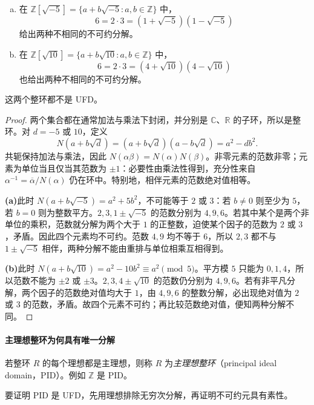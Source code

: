 \documentclass[lang=cn,a4paper,fontset=none,zihao=false,10pt,openany,twoside]{beautybook}
\numberwithin{algorithm}{chapter}
\begin{document}
\begin{example}[唯一分解失效的两个整环]
\begin{enumerate}[(a)]
\item 在 $\mathbb Z[\sqrt{-5}]=\{a+b\sqrt{-5}:a,b\in\mathbb Z\}$ 中，
\[
 6=2\cdot3=(1+\sqrt{-5})(1-\sqrt{-5})
\]
给出两种不相同的不可约分解。
\item 在 $\mathbb Z[\sqrt{10}]=\{a+b\sqrt{10}:a,b\in\mathbb Z\}$ 中，
\[
 6=2\cdot3=(4+\sqrt{10})(4-\sqrt{10})
\]
也给出两种不相同的不可约分解。
\end{enumerate}
这两个整环都不是 UFD。
\end{example}
\begin{proof}
两个集合都在通常加法与乘法下封闭，并分别是 $\mathbb C$、$\mathbb R$ 的子环，所以是整环。对 $d=-5$ 或 $10$，定义
\[
 N(a+b\sqrt d)=(a+b\sqrt d)(a-b\sqrt d)=a^2-db^2.
\]
共轭保持加法与乘法，因此 $N(\alpha\beta)=N(\alpha)N(\beta)$。非零元素的范数非零；元素为单位当且仅当其范数为 $\pm1$：必要性由乘法性得到，充分性来自 $\alpha^{-1}=\overline\alpha/N(\alpha)$ 仍在环中。特别地，相伴元素的范数绝对值相等。

\par\smallskip\noindent\textbf{(a)}\quad 此时 $N(a+b\sqrt{-5})=a^2+5b^2$，不可能等于 $2$ 或 $3$：若 $b\ne0$ 则至少为 $5$，若 $b=0$ 则为整数平方。$2,3,1\pm\sqrt{-5}$ 的范数分别为 $4,9,6$。若其中某个是两个非单位的乘积，范数就分解为两个大于 $1$ 的正整数，迫使某个因子的范数为 $2$ 或 $3$，矛盾。因此四个元素均不可约。范数 $4,9$ 均不等于 $6$，所以 $2,3$ 都不与 $1\pm\sqrt{-5}$ 相伴，两种分解不能由重排与单位相乘互相得到。

\par\smallskip\noindent\textbf{(b)}\quad 此时 $N(a+b\sqrt{10})=a^2-10b^2\equiv a^2\pmod5$。平方模 $5$ 只能为 $0,1,4$，所以范数不能为 $\pm2$ 或 $\pm3$。$2,3,4\pm\sqrt{10}$ 的范数仍分别为 $4,9,6$。若有非平凡分解，两个因子的范数绝对值均大于 $1$，由 $4,9,6$ 的整数分解，必出现绝对值为 $2$ 或 $3$ 的范数，矛盾。故四个元素不可约；再比较范数绝对值，便知两种分解不同。
\end{proof}

\paragraph{主理想整环为何具有唯一分解}
\begin{definition}[主理想整环]
若整环 $R$ 的每个理想都是主理想，则称 $R$ 为\emph{主理想整环}（principal ideal domain，PID）。例如 $\mathbb Z$ 是 PID。
\end{definition}
要证明 PID 是 UFD，先用理想排除无穷次分解，再证明不可约元具有素性。
\end{document}
